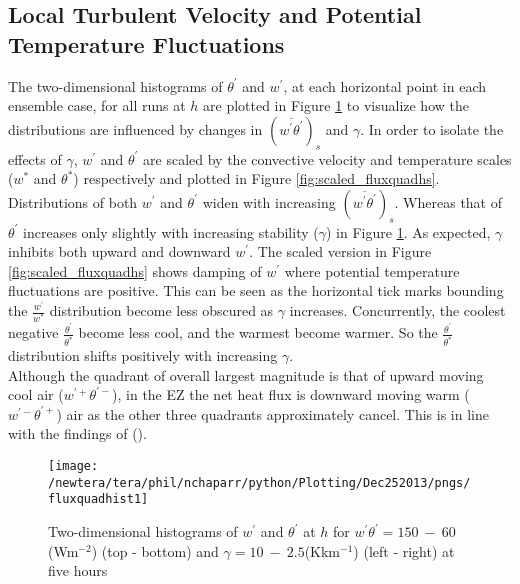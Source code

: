 \clearpage

\subsection{Local Turbulent Velocity and Potential Temperature Fluctuations}
\label{subsec:fluxquadrants}     
\FloatBarrier

The two-dimensional histograms of $\theta^{'}$ and $w^{'}$, at each horizontal point in each ensemble case, for all runs at $h$ are plotted in Figure \ref{fig:fluxquadsh} to visualize how the distributions are influenced by changes in $(\overline{w^{'} \theta^{'}})_{s}$ and $\gamma$.  In order to isolate the effects of $\gamma$,  $w^{'}$ and $\theta^{'}$ are scaled by the convective velocity and temperature scales ($w^{*}$ and $\theta^{*}$) respectively and plotted in Figure \ref{fig:scaled_fluxquadhs}.\\

Distributions of both $w^{'}$ and $\theta^{'}$ widen with increasing $(\overline{w^{'}\theta^{'}})_{s}$.  Whereas that of $\theta^{'}$ increases only slightly with increasing stability ($\gamma$) in Figure \ref{fig:fluxquadsh}.  As expected, $\gamma$ inhibits both upward and downward $w^{'}$. The scaled version in Figure \ref{fig:scaled_fluxquadhs} shows damping of $w^{'}$ where potential temperature fluctuations are positive.  This can be seen as the horizontal tick marks bounding the $\frac{w^{'}}{w^{*}}$ distribution become less obscured as $\gamma$ increases.  Concurrently, the coolest negative $\frac{\theta^{'}}{\theta^{*}}$ become less cool, and the warmest become warmer.  So the $\frac{\theta^{'}}{\theta^{*}}$ distribution shifts positively with increasing $\gamma$.\\ 

Although the quadrant of overall largest magnitude is that of upward moving cool air ($w^{'+}\theta^{'-}$), in the \acs{EZ} the net heat flux is downward moving warm ($w^{'-}\theta^{'+}$) air as the other three quadrants approximately cancel.  This is in line with the findings of \citeauthor{SullMoengStev} (\citeyear{SullMoengStev}). \\


\begin{figure}[htbp]
\centering
 \texttt{[image: /newtera/tera/phil/nchaparr/python/Plotting/Dec252013/pngs/fluxquadhist1]}                 
\caption[Two-dimensional Distributions of $w^{'}$ and $\theta^{'}$ for all Runs]{Two-dimensional histograms of $w^{'}$ and $\theta^{'}$ at $h$ for $ w^{'}\theta^{'} = 150 \ - \ 60\ $ (Wm$^{-2}$) (top - bottom) and $\gamma = 10 \ - \  2.5 $(Kkm$^{-1}$) (left - right) at five hours}
\label{fig:fluxquadsh}
\end{figure}


